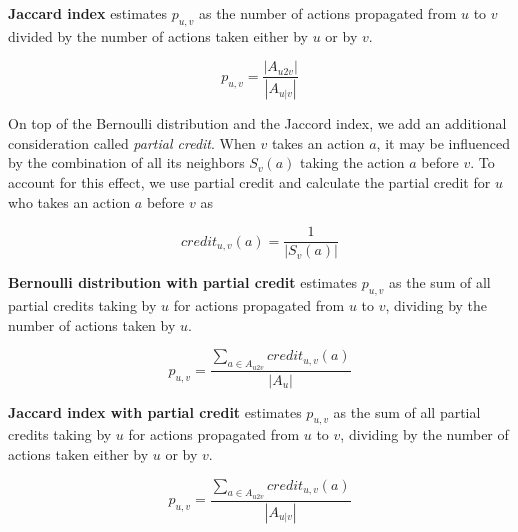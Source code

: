 {\bf Jaccard index} estimates 
$p_{u,v}$ as the number of actions propagated from $u$ to $v$ divided by 
the number of actions taken either by $u$ or by $v$.

$$p_{u,v} = \frac{|A_{u2v}|}{|A_{u|v}|}$$ 

On top of the Bernoulli distribution and the Jaccord index,
we add an additional consideration called {\em partial credit}.
When $v$ takes an action $a$, it may be influenced by the combination of all its neighbors $S_v(a)$ 
taking the action $a$ before $v$. %
To account for this effect, we use partial credit 
and calculate the partial credit for $u$ who takes an action $a$ before $v$ as 

$$credit_{u,v}(a) = \frac{1}{|S_v(a)|}$$

{\bf Bernoulli distribution with partial credit} 
estimates $p_{u,v}$ as the sum of all partial credits taking by $u$ for actions propagated from $u$ to $v$, 
dividing by the number of actions taken by $u$. 

$$p_{u,v} = \frac{\sum\limits_{a \in A_{u2v}}{credit_{u,v}(a)}}{|A_u|}$$

{\bf Jaccard index with partial credit} 
estimates $p_{u,v}$ as the sum of all partial credits taking by $u$ for actions propagated from $u$ to $v$, 
dividing by the number of actions taken either by $u$ or by $v$. 

$$p_{u,v} = \frac{\sum\limits_{a \in A_{u2v}}{credit_{u,v}(a)}}{|A_{u|v}|}$$




